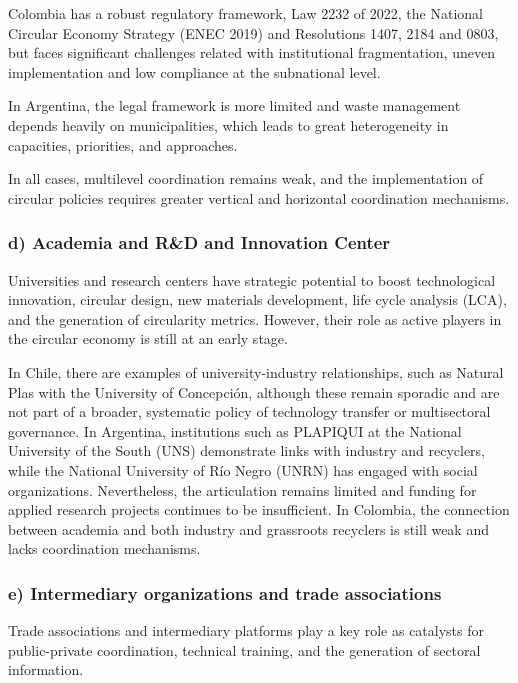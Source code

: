 \documentclass[
  12pt,
  oneside]{book}
\begin{document}
Colombia has a robust regulatory framework, Law 2232 of 2022, the
National Circular Economy Strategy (ENEC 2019) and Resolutions 1407,
2184 and 0803, but faces significant challenges related with
institutional fragmentation, uneven implementation and low compliance at
the subnational level.

In Argentina, the legal framework is more limited and waste management
depends heavily on municipalities, which leads to great heterogeneity in
capacities, priorities, and approaches.

In all cases, multilevel coordination remains weak, and the
implementation of circular policies requires greater vertical and
horizontal coordination mechanisms.

\subsubsection{d) Academia and R\&D and Innovation
Center}\label{d-academia-and-rd-and-innovation-center}

Universities and research centers have strategic potential to boost
technological innovation, circular design, new materials development,
life cycle analysis (LCA), and the generation of circularity metrics.
However, their role as active players in the circular economy is still
at an early stage.

In Chile, there are examples of university-industry relationships, such
as Natural Plas with the University of Concepción, although these remain
sporadic and are not part of a broader, systematic policy of technology
transfer or multisectoral governance. In Argentina, institutions such as
PLAPIQUI at the National University of the South (UNS) demonstrate links
with industry and recyclers, while the National University of Río Negro
(UNRN) has engaged with social organizations. Nevertheless, the
articulation remains limited and funding for applied research projects
continues to be insufficient. In Colombia, the connection between
academia and both industry and grassroots recyclers is still weak and
lacks coordination mechanisms.

\subsubsection{e) Intermediary organizations and trade
associations}\label{e-intermediary-organizations-and-trade-associations}

Trade associations and intermediary platforms play a key role as
catalysts for public-private coordination, technical training, and the
generation of sectoral information.
\end{document}
